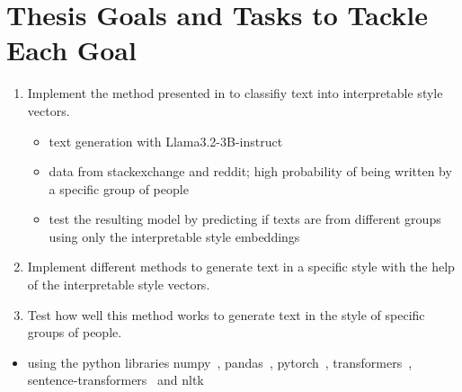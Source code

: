 
\section{Thesis Goals and Tasks to Tackle Each Goal}

\begin{enumerate}[label=\textbf{Goal \arabic*:}]
  \item Implement the method presented in \citet{patelLearningInterpretableStyle2023} to classifiy text into interpretable style vectors.
  \begin{itemize}
    \item text generation with Llama3.2-3B-instruct~\cite{dubeyLlama3Herd2024}
    \item data from stackexchange and reddit; high probability of being written by a specific group of people
    \item test the resulting model by predicting if texts are from different groups using only the interpretable style embeddings
  \end{itemize}
  \item Implement different methods to generate text in a specific style with the help of the interpretable style vectors.
  \item Test how well this method works to generate text in the style of specific groups of people.
\end{enumerate}

\begin{itemize}
  \item using the python libraries numpy~\cite{harris2020array}, pandas~\cite{reback2020pandas,mckinney-proc-scipy-2010}, pytorch~\cite{paszkePyTorchImperativeStyle2019}, transformers~\cite{wolfHuggingFacesTransformersStateart2020}, sentence-transformers~\cite{reimersSentenceBERTSentenceEmbeddings2019} and nltk~\cite{birdNaturalLanguageProcessing2009}
\end{itemize}
